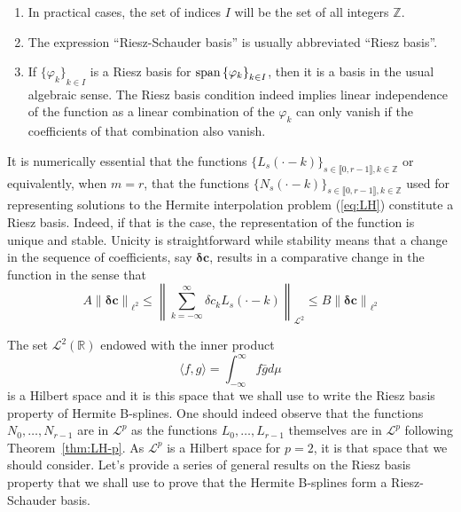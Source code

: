 \begin{remark} 
  \begin{enumerate} \item In practical cases, the set of indices $I$ will be the set of all integers $\mathbb{Z}$.  
    \item The expression ``Riesz-Schauder basis'' is usually abbreviated ``Riesz basis''.  
    \item If ${\{\varphi_k\}}_{k \in I}$ is a Riesz basis for $\operatorname*{span}{\{\varphi_k\}}_{k \in I}$, then it is a basis in 
      the usual algebraic sense.  The Riesz basis condition indeed implies linear independence of the function as a 
      linear combination of the $\varphi_k$ can only vanish if the coefficients of that combination also vanish.
  \end{enumerate} 
\end{remark} 


It is numerically essential that the functions $\{L_s(\cdot-k)\}_{s\in \llbracket0,r-1\rrbracket, k \in \mathbb{Z}}$ or 
equivalently, when $m=r$, that the functions $\{N_s(\cdot-k)\}_{s\in \llbracket0,r-1\rrbracket, k \in \mathbb{Z}}$ used 
for representing solutions to the Hermite interpolation problem (\ref{eq:LH}) constitute a Riesz basis. Indeed, if that 
is the case, the representation of the function is unique and stable. Unicity is straightforward while stability means 
that a change in the sequence of coefficients, say  $\bm{\delta c}$, results in a comparative change in the function in 
the sense that \begin{equation}
  A {\|\bm{\delta c}\|}_{\ell^2} \leq {\left\| \sum_{k=-\infty}^{\infty} \delta c_k L_s(\cdot-k) 
  \right\|}_{\mathcal{L}^2} \leq B {\|\bm{\delta c}\|}_{\ell^2}
\end{equation} 

The set $\mathcal{L}^{2}(\mathbb{R})$ endowed with the inner product 
\begin{equation}\label{eq:inner-prod}
  \langle f,g\rangle = \int_{-\infty}^{\infty} f\bar{g} d\mu 
\end{equation}
is a Hilbert space and it is this space that we shall use to write the Riesz basis property of Hermite B-splines.  One 
should indeed observe that the functions $N_0, \ldots, N_{r-1}$ are in $\mathcal{L}^p$ as the functions $L_0, \ldots, 
L_{r-1}$ themselves are in $\mathcal{L}^p$ following Theorem~\ref{thm:LH-p}. As $\mathcal{L}^p$ is a Hilbert space for 
$p=2$, it is that space that we should consider.  Let's provide a series of general results on the Riesz basis property 
that we shall use to prove that the Hermite B-splines form a Riesz-Schauder basis.  

